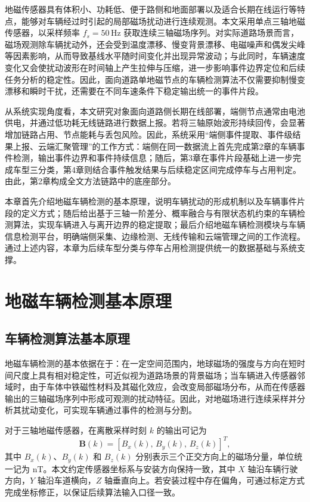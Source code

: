 \documentclass{xdupgthesis}
\newcommand{\Fs}{\ensuremath{50\,\mathrm{Hz}}}
\newcommand{\MagUnit}{\ensuremath{\mathrm{nT}}}
\begin{document}
地磁传感器具有体积小、功耗低、便于路侧和地面部署以及适合长期在线运行等特点，能够对车辆经过时引起的局部磁场扰动进行连续观测。本文采用单点三轴地磁传感器，以采样频率 $f_s=\Fs$ 获取连续三轴磁场序列。对实际道路场景而言，磁场观测除车辆扰动外，还会受到温度漂移、慢变背景漂移、电磁噪声和偶发尖峰等因素影响，从而导致基线水平随时间变化并出现异常波动；与此同时，车辆速度变化又会使扰动波形在时间轴上产生拉伸与压缩，进一步影响事件边界定位和后续任务分析的稳定性。因此，面向道路单地磁节点的车辆检测算法不仅需要抑制慢变漂移和瞬时干扰，还需要在不同车速条件下稳定输出统一的事件片段。

从系统实现角度看，本文研究对象面向道路侧长期在线部署，端侧节点通常由电池供电，并通过低功耗无线链路进行数据上报。若将三轴原始波形持续回传，会显著增加链路占用、节点能耗与丢包风险。因此，系统采用“端侧事件提取、事件级结果上报、云端汇聚管理”的工作方式：端侧在同一数据流上首先完成第2章的车辆事件检测，输出事件边界和事件持续信息；随后，第3章在事件片段基础上进一步完成车型三分类，第4章则结合事件触发结果与后续稳定区间完成停车与占用判定。由此，第2章构成全文方法链路中的底座部分。

本章首先介绍地磁车辆检测的基本原理，说明车辆扰动的形成机制以及车辆事件片段的定义方式；随后给出基于三轴一阶差分、概率融合与有限状态机约束的车辆检测算法，实现车辆进入与离开边界的稳定提取；最后介绍地磁车辆检测模块与车辆信息检测平台，明确端侧采集、边缘检测、无线传输和云端管理之间的工作流程。通过上述内容，本章为后续车型分类与停车占用检测提供统一的数据基础与系统支撑。

\section{地磁车辆检测基本原理}
\label{sec:ch2_principle}

\subsection{车辆检测算法基本原理}
\label{sec:ch2_basic}

地磁车辆检测的基本依据在于：在一定空间范围内，地球磁场的强度与方向在短时间尺度上具有相对稳定性，可近似视为道路场景的背景磁场；当车辆进入传感器邻域时，由于车体中铁磁性材料及其磁化效应，会改变局部磁场分布，从而在传感器输出的三轴磁场序列中形成可观测的扰动特征。因此，对地磁场进行连续采样并分析其扰动变化，可实现车辆通过事件的检测与分割。

对于三轴地磁传感器，在离散采样时刻 $k$ 的输出可记为
\begin{equation}
    \mathbf{B}(k) = [B_x(k),\,B_y(k),\,B_z(k)]^T,
\end{equation}
其中 $B_x(k)$、$B_y(k)$ 和 $B_z(k)$ 分别表示三个正交方向上的磁场分量，单位统一记为 \MagUnit。本文约定传感器坐标系与安装方向保持一致，其中 $X$ 轴沿车辆行驶方向，$Y$ 轴沿车道横向，$Z$ 轴垂直向上。若安装过程中存在偏角，可通过标定方式完成坐标修正，以保证后续算法输入口径一致。
\end{document}
